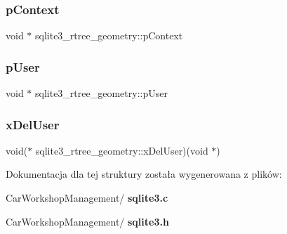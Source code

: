 \subsubsection{pContext}
{\footnotesize\ttfamily void $\ast$ sqlite3\+\_\+rtree\+\_\+geometry\+::p\+Context}

\mbox{\label{structsqlite3__rtree__geometry_a6fdedfd741cf5055f9562298cd32dc74}} 
\subsubsection{pUser}
{\footnotesize\ttfamily void $\ast$ sqlite3\+\_\+rtree\+\_\+geometry\+::p\+User}

\mbox{\label{structsqlite3__rtree__geometry_afa1ed10f488b306df354efe56efdf287}} 
\subsubsection{xDelUser}
{\footnotesize\ttfamily void($\ast$ sqlite3\+\_\+rtree\+\_\+geometry\+::x\+Del\+User)(void $\ast$)}



Dokumentacja dla tej struktury została wygenerowana z plików\+:\begin{DoxyCompactItemize}
\item 
Car\+Workshop\+Management/\textbf{ sqlite3.\+c}\item 
Car\+Workshop\+Management/\textbf{ sqlite3.\+h}\end{DoxyCompactItemize}

